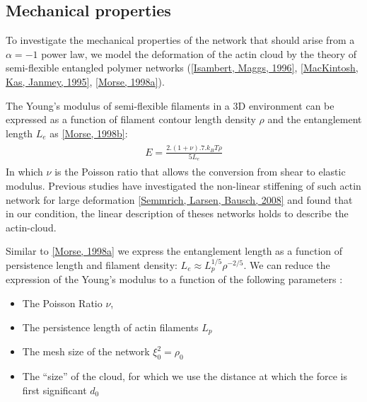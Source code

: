 \documentclass[A4paperpaper,11pt,english]{sphinxmanual}
\begin{document}
\subsection{Mechanical properties}
\label{index-latex:mechanical-properties}
To investigate the mechanical properties of the network that should arise from
a \(\alpha = -1\) power law, we model the deformation of the actin cloud by
the theory of semi-flexible entangled polymer networks ({\hyperref[index-latex:isambert1996]{{[}Isambert, Maggs,  1996{]}}},
{\hyperref[index-latex:mackintosh1995]{{[}MacKintosh, Kas, Janmey,  1995{]}}}, {\hyperref[index-latex:morse1998a]{{[}Morse,  1998a{]}}}).

The Young's modulus of semi-flexible filaments in a 3D environment can be
expressed as a function of filament contour length density \(\rho\) and the
entanglement length \(L_e\) as {\hyperref[index-latex:morse1998b]{{[}Morse,  1998b{]}}}:
\label{index-latex:equation-eqa37}\begin{gather}
\begin{split}E= \frac{2.(1+\nu).7.k_BT \rho}{5L_e}\end{split}\label{index-latex-eqa37}
\end{gather}
In which \(\nu\) is the Poisson ratio that allows the conversion from shear to
elastic modulus. Previous studies have investigated the non-linear stiffening of
such actin network for large deformation {\hyperref[index-latex:semmrich2008]{{[}Semmrich, Larsen, Bausch,  2008{]}}} and found that in
our condition, the linear description of theses networks holds to describe the
actin-cloud.

Similar to {\hyperref[index-latex:morse1998a]{{[}Morse,  1998a{]}}} we express the entanglement length as a
function of persistence length and filament density: \(L_e\approx L_p^{1/5} \rho^{-2/5}\). We can
reduce the expression of the Young's modulus to a function of the following
parameters :
\begin{itemize}
\item {} 
The Poisson Ratio \(\nu\),

\item {} 
The persistence length of actin filaments \(L_p\)

\item {} 
The mesh size of the network \(\xi_0^2 = \rho_0\)

\item {} 
The ``size'' of the cloud, for which we use the distance at which the force
is first significant \(d_0\)

\end{itemize}
\end{document}
